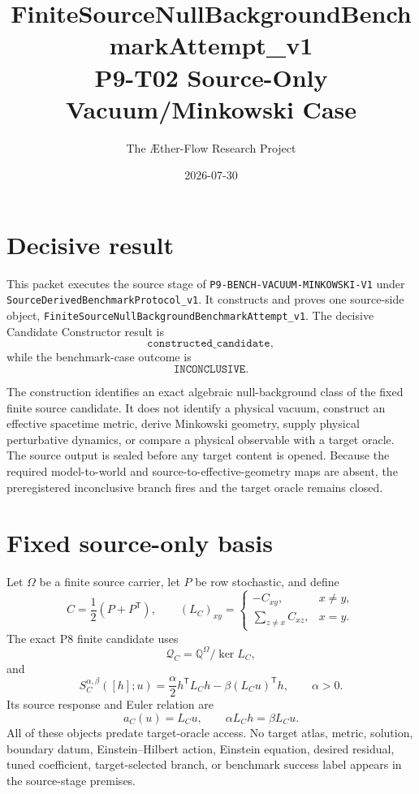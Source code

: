 \documentclass[11pt]{article}
\title{FiniteSourceNullBackgroundBenchmarkAttempt\_v1\\
P9-T02 Source-Only Vacuum/Minkowski Case}
\author{The \AE ther-Flow Research Project}
\date{2026-07-30}
\newcommand{\Q}{\mathbb Q}
\newcommand{\Qspace}{\mathcal Q_C}
\begin{document}
\sloppy
\maketitle

\section{Decisive result}

This packet executes the source stage of
\texttt{P9-BENCH-VACUUM-MINKOWSKI-V1} under
\texttt{SourceDerivedBenchmarkProtocol\_v1}.  It constructs and proves one
source-side object,
\texttt{FiniteSourceNullBackgroundBenchmarkAttempt\_v1}.  The decisive
Candidate Constructor result is
\[
  \texttt{constructed\_candidate},
\]
while the benchmark-case outcome is
\[
  \texttt{INCONCLUSIVE}.
\]

The construction identifies an exact algebraic null-background class of the
fixed finite source candidate.  It does not identify a physical vacuum,
construct an effective spacetime metric, derive Minkowski geometry, supply
physical perturbative dynamics, or compare a physical observable with a
target oracle.  The source output is sealed before any target content is
opened.  Because the required model-to-world and source-to-effective-geometry
maps are absent, the preregistered inconclusive branch fires and the target
oracle remains closed.

\section{Fixed source-only basis}

Let \(\Omega\) be a finite source carrier, let \(P\) be row stochastic, and
define
\[
  C=\frac12(P+P^{\mathsf T}),\qquad
  (L_C)_{xy}=
  \begin{cases}
    -C_{xy},&x\ne y,\\
    \displaystyle\sum_{z\ne x}C_{xz},&x=y.
  \end{cases}
\]
The exact P8 finite candidate uses
\[
  \Qspace=\Q^\Omega/\ker L_C,
\]
and
\begin{equation}
  S_C^{\alpha,\beta}([h];u)
  =\frac{\alpha}{2}h^{\mathsf T}L_Ch
   -\beta(L_Cu)^{\mathsf T}h,
  \qquad \alpha>0.
  \label{eq:action}
\end{equation}
Its source response and Euler relation are
\[
  a_C(u)=L_Cu,\qquad
  \alpha L_Ch=\beta L_Cu.
\]
All of these objects predate target-oracle access.  No target atlas, metric,
solution, boundary datum, Einstein--Hilbert action, Einstein equation,
desired residual, tuned coefficient, target-selected branch, or benchmark
success label appears in the source-stage premises.
\end{document}
